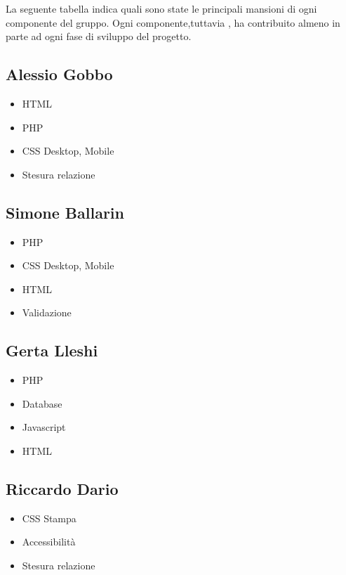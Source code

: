 La seguente tabella indica quali sono state le principali mansioni di ogni componente del gruppo. Ogni componente,tuttavia , ha contribuito almeno in parte ad ogni fase di sviluppo del progetto.

\subsection{Alessio Gobbo}

\begin{itemize}
	\item HTML
	\item PHP 
	\item CSS Desktop, Mobile
	\item Stesura relazione
\end{itemize}

\subsection{Simone Ballarin}

\begin{itemize}
	\item PHP 
	\item CSS Desktop, Mobile
	\item HTML
	\item Validazione
\end{itemize}

\subsection{Gerta Lleshi}

\begin{itemize}
	\item PHP
	\item Database
	\item Javascript
	\item HTML
\end{itemize}

\subsection{Riccardo Dario}

\begin{itemize}
	\item CSS Stampa
	\item Accessibilità
	\item Stesura relazione
\end{itemize}

